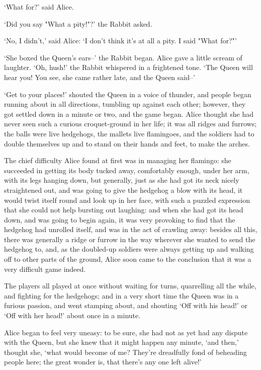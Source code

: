 \documentclass[statementpaper,twoside,openany]{memoir}
\begin{document}
`What for?' said Alice.

`Did you say "What a pity!"?' the Rabbit asked.

`No, I didn't,' said Alice: `I don't think it's at all a pity. I said "What for?"'

`She boxed the Queen's ears--' the Rabbit began. Alice gave a little scream of laughter. `Oh, hush!' the Rabbit whispered in a frightened tone. `The Queen will hear you! You see, she came rather late, and the Queen said--'

`Get to your places!' shouted the Queen in a voice of thunder, and people began running about in all directions, tumbling up against each other; however, they got settled down in a minute or two, and the game began. Alice thought she had never seen such a curious croquet-ground in her life; it was all ridges and furrows; the balls were live hedgehogs, the mallets live flamingoes, and the soldiers had to double themselves up and to stand on their hands and feet, to make the arches.

The chief difficulty Alice found at first was in managing her flamingo: she succeeded in getting its body tucked away, comfortably enough, under her arm, with its legs hanging down, but generally, just as she had got its neck nicely straightened out, and was going to give the hedgehog a blow with its head, it would twist itself round and look up in her face, with such a puzzled expression that she could not help bursting out laughing: and when she had got its head down, and was going to begin again, it was very provoking to find that the hedgehog had unrolled itself, and was in the act of crawling away: besides all this, there was generally a ridge or furrow in the way wherever she wanted to send the hedgehog to, and, as the doubled-up soldiers were always getting up and walking off to other parts of the ground, Alice soon came to the conclusion that it was a very difficult game indeed.

The players all played at once without waiting for turns, quarrelling all the while, and fighting for the hedgehogs; and in a very short time the Queen was in a furious passion, and went stamping about, and shouting `Off with his head!' or `Off with her head!' about once in a minute.

Alice began to feel very uneasy: to be sure, she had not as yet had any dispute with the Queen, but she knew that it might happen any minute, `and then,' thought she, `what would become of me? They're dreadfully fond of beheading people here; the great wonder is, that there's any one left alive!'
\end{document}
